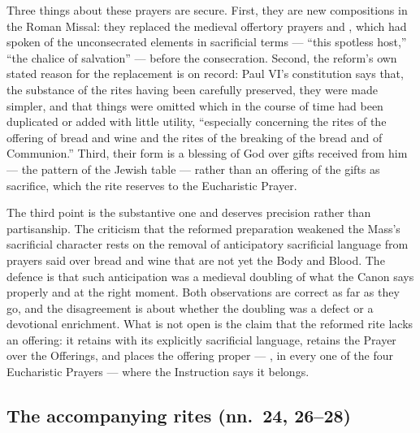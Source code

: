 Three things about these prayers are secure. First, they are new compositions in the Roman
Missal: they replaced the medieval offertory prayers  and
, which had spoken of the unconsecrated elements in sacrificial
terms --- ``this spotless host,'' ``the chalice of salvation'' --- before the consecration.
Second, the reform's own stated reason for the replacement is on record: Paul VI's constitution
says that, the substance of the rites having been carefully preserved, they were made simpler,
and that things were omitted which in the course of time had been duplicated or added with
little utility, ``especially concerning the rites of the offering of bread and wine and the
rites of the breaking of the bread and of Communion.'' Third, their form is a
blessing of God over gifts received from him --- the pattern of the Jewish table
 --- rather than an offering of the gifts as sacrifice, which the rite reserves
to the Eucharistic Prayer.

The third point is the substantive one and deserves precision rather than partisanship. The
criticism that the reformed preparation weakened the Mass's sacrificial character rests on the
removal of anticipatory sacrificial language from prayers said over bread and wine that are not
yet the Body and Blood. The defence is that such anticipation was a medieval doubling of what
the Canon says properly and at the right moment. Both observations are correct as far as they
go, and the disagreement is about whether the doubling was a defect or a devotional enrichment.
What is not open is the claim that the reformed rite lacks an offering: it retains
 with its explicitly sacrificial language, retains the Prayer over the
Offerings, and places the offering proper --- , in every one of the four
Eucharistic Prayers --- where the Instruction says it belongs.

\subsection{The accompanying rites (nn.\ 24, 26--28)}

